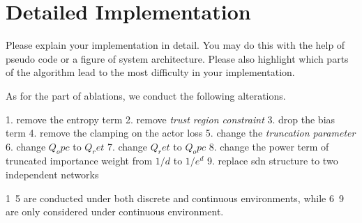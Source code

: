 \section{Detailed Implementation}
\label{section:implementation}
Please explain your implementation in detail. You may do this with the help of pseudo code or a figure of system architecture. Please also highlight which parts of the algorithm lead to the most difficulty in your implementation.


As for the part of ablations, we conduct the following alterations. 

1. remove the entropy term
2. remove \emph{trust region constraint}
3. drop the bias term 
4. remove the clamping on the actor loss
5. change the \emph{truncation parameter}
6. change $Q_opc$ to $Q_ret$ 
7. change $Q_ret$ to $Q_opc$
8. change the power term of truncated importance weight from $1/d$ to $1 / e^d$
9. replace sdn structure to two independent networks

1~5 are conducted under both discrete and continuous environments, while 6~9 are only considered under continuous environment.

